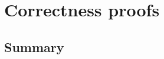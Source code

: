 \chapter{Correctness proofs}\label{ch29}

\newpage
\section{Summary}\label{ch29.summary}

\ldefsummary %
\lthmsummary %
\lthmaddeddefsummary %
\lthmaddedthmsummary %
\lzevessummary %
